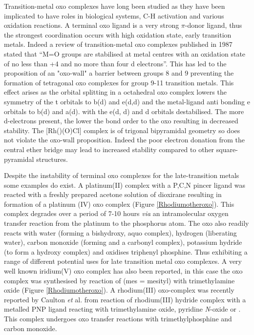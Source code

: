 Transition-metal oxo complexes have long been studied as they have been implicated to have roles in  biological systems,\cite{Lipscomb1994, Merkx2001, Tinberg2011, Montellano2010} C-H activation\cite{Balcells2010, Borovik2011} and various oxidation reactions\cite{Holm1987, Atlay1983, Poverenov2008}.  A terminal oxo ligand is a very strong $\pi$-donor ligand, thus the strongest coordination occurs with high oxidation state, early transition metals\cite{Anderson2004}.  Indeed a review of transition-metal oxo complexes published in 1987 stated that ``M=O groups are stabilised at metal centres with an oxidation state of no less than +4 and no more than four d electrons''.\cite{Holm1987}  This has led to the proposition of an "oxo-wall" a barrier between groups 8 and 9 preventing the formation of tetragonal oxo complexes for group 9-11 transition metals.\cite{Winkler2011}  This effect arises as the orbital splitting in a octahedral oxo complex lowers the symmetry of the t orbitals to b(d) and e(d,d) and the metal-ligand anti bonding e orbitals to b(d) and a(d).  with the e(d, d) and d orbitals destabilised.\cite{Betley2008}  The more d-electrons present, the lower the bond order to the oxo resulting in decreased stability.  The [Rh(\tBuxantphos)(O)Cl] complex is of trigonal bipyramidal geometry so does not violate the oxo-wall proposition.  Indeed the poor electron donation from the central ether bridge may lead to increased stability compared to other square-pyramidal structures.  

Despite the instability of terminal oxo complexes for the late-transition metals some examples do exist.  A platinum(II) complex with a P,C,N pincer ligand was reacted with a freshly prepared acetone solution of dioxirane resulting in formation of a platinum (IV) oxo complex (Figure \ref{Rhodiumotheroxo}).\cite{Poverenov2008}  This complex degrades over a period of 7-10 hours \emph{via} an intramolecular oxygen transfer reaction from the platinum to the phosphorus atom.  The oxo also readily reacts with water (forming a bishydroxy, aquo complex), hydrogen (liberating water), carbon monoxide (forming  and a carbonyl complex), potassium hydride (to form a hydroxy complex) and oxidises triphenyl phosphine.  Thus exhibiting a range of different potential uses for late transition metal oxo complexes.  A very well known iridium(V) oxo complex has also been reported, in this case the oxo complex was synthesised by reaction of \ce{[Ir(mes)3]} (mes = mesityl) with trimethylamine oxide (Figure \ref{Rhodiumotheroxo}).\cite{Motherwell1993}  A rhodium(III) oxo-complex was recently reported by Caulton \emph{et} al. from reaction of rhodium(III) hydride complex with a metalled PNP ligand reacting with trimethylamine oxide, pyridine \emph{N}-oxide or .\cite{Verat2008, Tsvetkov2013}  This complex undergoes oxo transfer reactions with trimethylphosphine and carbon monoxide.

